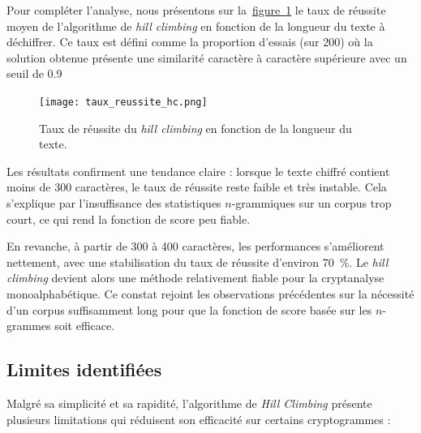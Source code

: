 \documentclass[a4paper]{article}
\newcommand{\figref}[1]{\hyperref[#1]{figure~\ref*{#1}}}
\begin{document}
Pour compléter l’analyse, nous présentons sur la~\figref{fig:taux_reussite} le taux de réussite moyen de l’algorithme de \textit{hill climbing} en fonction de la longueur du texte à déchiffrer. Ce taux est défini comme la proportion d’essais (sur 200) où la solution obtenue présente une similarité caractère à caractère supérieure avec un seuil de 0.9

\begin{figure}[H]
\centering
\texttt{[image: taux\_reussite\_hc.png]}
\caption{Taux de réussite du \textit{hill climbing} en fonction de la longueur du texte.}
\label{fig:taux_reussite}
\end{figure}


Les résultats confirment une tendance claire : lorsque le texte chiffré contient moins de 300 caractères, le taux de réussite reste faible et très instable. Cela s'explique par l’insuffisance des statistiques $n$-grammiques sur un corpus trop court, ce qui rend la fonction de score peu fiable.

En revanche, à partir de 300 à 400 caractères, les performances s'améliorent nettement, avec une stabilisation du taux de réussite d'environ 70~\%. Le \textit{hill climbing} devient alors une méthode relativement fiable pour la cryptanalyse monoalphabétique. Ce constat rejoint les observations précédentes sur la nécessité d’un corpus suffisamment long pour que la fonction de score basée sur les $n$-grammes soit efficace.



\subsection{Limites identifiées}

Malgré sa simplicité et sa rapidité, l’algorithme de \textit{Hill Climbing} présente plusieurs limitations qui réduisent son efficacité sur certains cryptogrammes :
\end{document}
